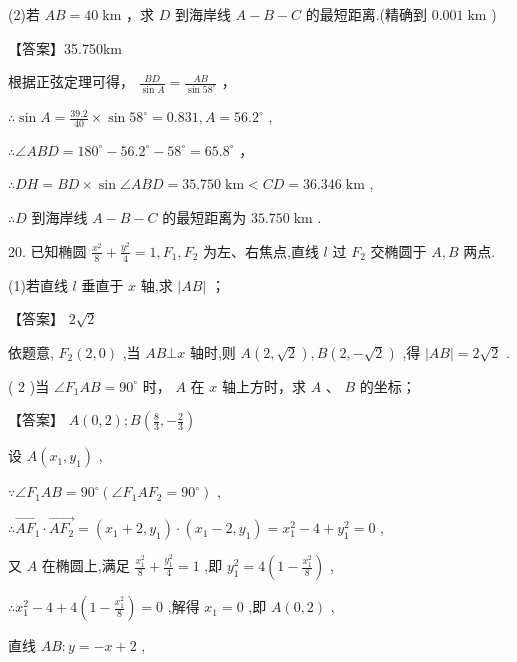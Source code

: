 \documentclass[10pt]{article}
\begin{document}
(2)若 \({AB} = {{40}\mathrm{\;{km}}}\) ，求 \(D\) 到海岸线 \(A - B - C\) 的最短距离.(精确到 \({0.001}\mathrm{\;{km}}\) )

【答案】35.750km

根据正弦定理可得， \(\frac{BD}{\sin A} = \frac{AB}{\sin {58}^{ \circ  }}\) ，

\(\therefore \sin A = \frac{39.2}{40} \times  \sin {58}^{ \circ  } = {0.831},A = {56.2}^{ \circ  }\) ,

\(\therefore \angle {ABD} = {180}^{ \circ  } - {56.2}^{ \circ  } - {58}^{ \circ  } = {65.8}^{ \circ  }\) ，

\(\therefore {DH} = {BD} \times  \sin \angle {ABD} = {35.750}\mathrm{\;{km}} < {CD} = {36.346}\mathrm{\;{km}}\) ,

\(\therefore D\) 到海岸线 \(A - B - C\) 的最短距离为 \({35.750}\mathrm{\;{km}}\) .

20. 已知椭圆 \(\frac{{x}^{2}}{8} + \frac{{y}^{2}}{4} = 1,{F}_{1},{F}_{2}\) 为左、右焦点,直线 \(l\) 过 \({F}_{2}\) 交椭圆于 \(A,B\) 两点.

(1)若直线 \(l\) 垂直于 \(x\) 轴,求 \(\left| {AB}\right|\) ；

【答案】 \(2\sqrt{2}\)

依题意, \({F}_{2}\left( {2,0}\right)\) ,当 \({AB} \bot  x\) 轴时,则 \(A\left( {2,\sqrt{2}}\right) ,B\left( {2, - \sqrt{2}}\right)\) ,得 \(\left| {AB}\right|  = 2\sqrt{2}\) .

( 2 )当 \(\angle {F}_{1}{AB} = {90}^{ \circ  }\) 时， \(A\) 在 \(x\) 轴上方时，求 \(A\) 、 \(B\) 的坐标；

【答案】 \(A\left( {0,2}\right) ;B\left( {\frac{8}{3}, - \frac{2}{3}}\right)\)

设 \(A\left( {{x}_{1},{y}_{1}}\right)\) ,

\(\because \angle {F}_{1}{AB} = {90}^{ \circ  }\left( {\angle {F}_{1}A{F}_{2} = {90}^{ \circ  }}\right)\) ,

\(\therefore \overrightarrow{A{F}_{1}} \cdot  \overrightarrow{A{F}_{2}} = \left( {{x}_{1} + 2,{y}_{1}}\right)  \cdot  \left( {{x}_{1} - 2,{y}_{1}}\right)  = {x}_{1}^{2} - 4 + {y}_{1}^{2} = 0\) ,

又 \(A\) 在椭圆上,满足 \(\frac{{x}_{1}^{2}}{8} + \frac{{y}_{1}^{2}}{4} = 1\) ,即 \({y}_{1}^{2} = 4\left( {1 - \frac{{x}_{1}^{2}}{8}}\right)\) ,

\(\therefore {x}_{1}^{2} - 4 + 4\left( {1 - \frac{{x}_{1}^{2}}{8}}\right)  = 0\) ,解得 \({x}_{1} = 0\) ,即 \(A\left( {0,2}\right)\) ,

直线 \({AB} : y =  - x + 2\) ,
\end{document}
